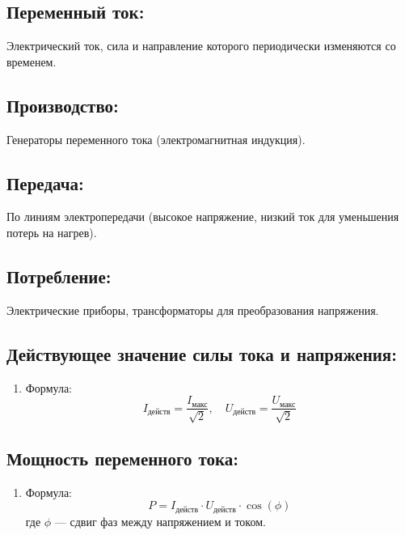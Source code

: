 \documentclass[a4paper,12pt]{article}
\begin{document}
\subsection*{Переменный ток:}
\vspace{-3pt}
Электрический ток, сила и направление которого периодически изменяются со временем.

\vspace{-9pt}
\subsection*{Производство:}
\vspace{-3pt}
Генераторы переменного тока (электромагнитная индукция).

\vspace{-9pt}
\subsection*{Передача:}
\vspace{-3pt}
По линиям электропередачи (высокое напряжение, низкий ток для уменьшения потерь на нагрев).

\vspace{-9pt}
\subsection*{Потребление:}
\vspace{-3pt}
Электрические приборы, трансформаторы для преобразования напряжения.

\vspace{-9pt}
\subsection*{Действующее значение силы тока и напряжения:}
\vspace{-3pt}
\begin{enumerate}[itemsep=0pt, topsep=0pt, parsep=3pt]
  \item Формула:
  \vspace{-0.05em}
  $$ I_{\text{действ}} = \frac{I_{\text{макс}}}{\sqrt{2}}, \quad U_{\text{действ}} = \frac{U_{\text{макс}}}{\sqrt{2}} $$
\end{enumerate}

\vspace{-9pt}
\subsection*{Мощность переменного тока:}
\vspace{-3pt}
\begin{enumerate}[itemsep=0pt, topsep=0pt, parsep=3pt]
  \item Формула:
  \vspace{-0.05em}
  $$ P = I_{\text{действ}} \cdot U_{\text{действ}} \cdot \cos(\phi) $$
  где $\phi$ — сдвиг фаз между напряжением и током.
\end{enumerate}
\end{document}
